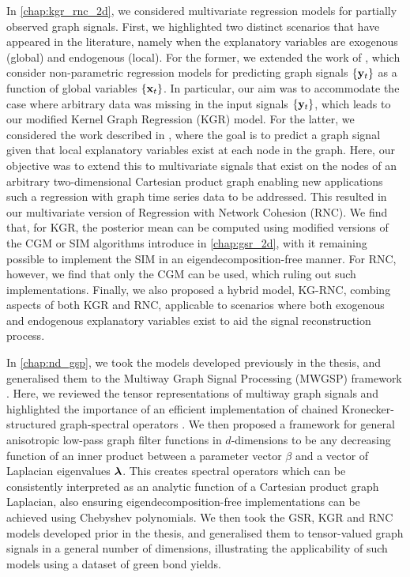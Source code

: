 In \cref{chap:kgr_rnc_2d}, we considered multivariate regression models for partially observed graph signals. First, we highlighted two distinct scenarios that have appeared in the literature, namely when the explanatory variables are exogenous (global) and endogenous (local). For the former, we extended the work of \cite{Venkitaraman2019,Venkitaraman2020}, which consider non-parametric regression models for predicting graph signals $\{\mathbf{y}_t\}$ as a function of global variables $\{\mathbf{x}_t\}$. In particular, our aim was to accommodate the case where arbitrary data was missing in the input signals $\{\mathbf{y}_t\}$, which leads to our modified Kernel Graph Regression (KGR) model. For the latter, we considered the work described in \cite{Li2019}, where the goal is to predict a graph signal given that local explanatory variables exist at each node in the graph. Here, our objective was to extend this to multivariate signals that exist on the nodes of an arbitrary two-dimensional Cartesian product graph enabling new applications such a regression with graph time series data to be addressed. This resulted in our multivariate version of Regression with Network Cohesion (RNC). We find that, for KGR, the posterior mean can be computed using modified versions of the CGM or SIM algorithms introduce in \cref{chap:gsr_2d}, with it remaining possible to implement the SIM in an eigendecomposition-free manner. For RNC, however, we find that only the CGM can be used, which ruling out such implementations. Finally, we also proposed a hybrid model, KG-RNC, combing aspects of both KGR and RNC, applicable to scenarios where both exogenous and endogenous explanatory variables exist to aid the signal reconstruction process. 

In \cref{chap:nd_gsp}, we took the models developed previously in the thesis, and generalised them to the Multiway Graph Signal Processing (MWGSP) framework \citep{Stanley2020}. Here, we reviewed the tensor representations of multiway graph signals and highlighted the importance of an efficient implementation of chained Kronecker-structured graph-spectral operators \citep{Antonian2023}. We then proposed a framework for general anisotropic low-pass graph filter functions in $d$-dimensions to be any decreasing function of an inner product between a parameter vector $\beta$ and a vector of Laplacian eigenvalues $\boldsymbol{\lambda}$. This creates spectral operators which can be consistently interpreted as an analytic function of a Cartesian product graph Laplacian, also ensuring eigendecomposition-free implementations can be achieved using Chebyshev polynomials. We then took the GSR, KGR and RNC models developed prior in the thesis, and generalised them to tensor-valued graph signals in a general number of dimensions, illustrating the applicability of such models using a dataset of green bond yields. 

